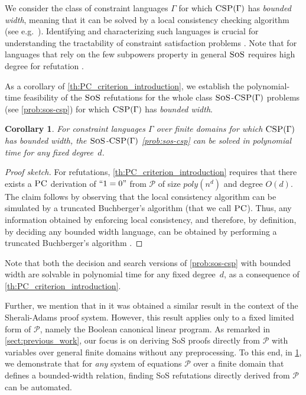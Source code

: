 \documentclass[11pt]{article}
\newcommand{\sos}{\text{\sc{SoS}}}
\newcommand{\CSP}{\textsc{CSP}}
\newcommand{\PC}{\textsc{PC}}
\newcommand{\1}{\textbf{1}}
\newtheorem{corollary}[theorem]{Corollary}
\begin{document}
We consider the class of constraint languages $\Gamma$ for which $\CSP(\Gamma)$ has \emph{bounded width}, meaning that it can be solved by a local consistency checking algorithm (see e.g.~\cite{BartoK14,barto_et_al:DFU:2017:6959}). Identifying and characterizing such languages is crucial for understanding the tractability of constraint satisfaction problems \cite{BartoK14,barto_et_al:DFU:2017:6959}. Note that for languages that rely on the {few subpowers property} in general $\sos$ requires high degree for refutation \cite{barto_et_al:DFU:2017:6959,BartoK14, GRIGORIEV2001613}.

As a corollary of \cref{th:PC_criterion_introduction}, we establish the polynomial-time feasibility of the $\sos$ refutations for the whole class $\sos$-$\CSP(\Gamma)$ problems (see \cref{prob:sos-csp}) for which $\CSP(\Gamma)$ has \emph{bounded width}. \begin{corollary}\label{th:BW}
    For constraint languages $\Gamma$ over finite domains for which $\CSP(\Gamma)$ has \emph{bounded width}, the $\sos$-$\CSP(\Gamma)$ \cref{prob:sos-csp} can be solved in polynomial time for any fixed degree~$d$.
\end{corollary}
\begin{proof}[Proof sketch]
    For refutations, \cref{th:PC_criterion_introduction} requires that there exists a $\PC$ derivation of $``1 = 0"$ from $\mathcal{P}$ of size $poly(n^d)$ and degree $O(d)$.
    The claim follows by observing that the local consistency algorithm can be simulated by a truncated Buchberger's algorithm (that we call $\PC$). Thus, any information obtained by enforcing local consistency{, and therefore, by definition, by deciding any bounded width language,} can be obtained by performing a truncated Buchberger's algorithm \cite{JeffersonJGD13,Bulatov23}.
\end{proof}

Note that both the decision and search versions of \cref{prob:sos-csp} with bounded width are solvable in polynomial time for any fixed degree~$d$, as a consequence of \cref{th:PC_criterion_introduction}.

Further, we mention that in \cite{ThapperZ18} it was obtained a similar result in the context of the Sherali-Adams proof system. However, this result applies only to a fixed limited form of $\mathcal{P}$, namely the Boolean canonical linear program. As remarked in \cref{sect:previous_work}, our focus is on deriving SoS proofs directly from $\mathcal{P}$ with variables over general finite domains without any preprocessing. To this end, in \cref{th:BW}, we demonstrate that for \emph{any} system of equations $\mathcal{P}$ over a finite domain that defines a bounded-width relation, finding SoS refutations directly derived from $\mathcal{P}$ can be automated.
\end{document}
